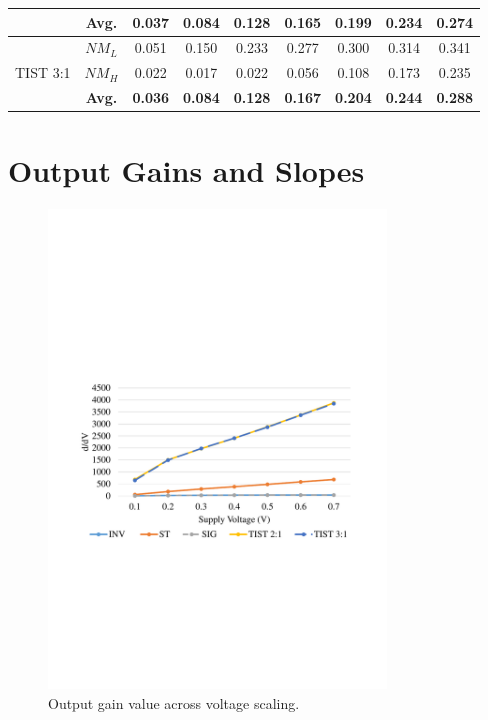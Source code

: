 \documentclass[pgmicro,diss,english]{iiufrgs}
\begin{document}
\begin{table}[H]
{\begin{tabular}{|c|c|c|c|c|c|c|c|c|}
 			  & \textbf{Avg.} & \textbf{0.037} & \textbf{0.084} & \textbf{0.128} & \textbf{0.165} & \textbf{0.199} & \textbf{0.234} & \textbf{0.274} \\ \hline
\multirow{3}{*}{TIST 3:1} & $NM_{L}$      & 0.051          & 0.150          & 0.233          & 0.277          & 0.300          & 0.314          & 0.341          \\ \cline{2-9}
                          & $NM_{H}$      & 0.022          & 0.017          & 0.022          & 0.056          & 0.108          & 0.173          & 0.235          \\ \cline{2-9}
                          & \textbf{Avg.} & \textbf{0.036} & \textbf{0.084} & \textbf{0.128} & \textbf{0.167} & \textbf{0.204} & \textbf{0.244} & \textbf{0.288} \\ \hline
\end{tabular}%
}
\end{table}

\section{Output Gains and Slopes}

    \begin{figure}[t]
        \centering
            \includegraphics[width=0.8\textwidth, trim={1.25cm 9cm 2cm 10cm}, clip]{gainComp.pdf}
            \caption{Output gain value across voltage scaling.}
        \label{figsGainComp}
    \end{figure}
\end{document}
